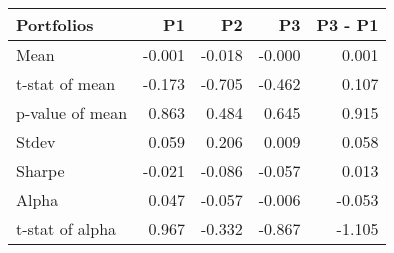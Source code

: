 \begin{tabular}{lrrrr}
\toprule
Portfolios & P1 & P2 & P3 & P3 - P1 \\
\midrule
Mean & -0.001 & -0.018 & -0.000 & 0.001 \\
t-stat of mean & -0.173 & -0.705 & -0.462 & 0.107 \\
p-value of mean & 0.863 & 0.484 & 0.645 & 0.915 \\
Stdev & 0.059 & 0.206 & 0.009 & 0.058 \\
Sharpe & -0.021 & -0.086 & -0.057 & 0.013 \\
Alpha & 0.047 & -0.057 & -0.006 & -0.053 \\
t-stat of alpha & 0.967 & -0.332 & -0.867 & -1.105 \\
\bottomrule
\end{tabular}
